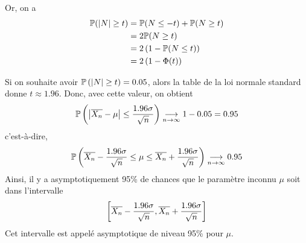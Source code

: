 Or, on a
\begin{equation*}
    \begin{aligned}
        \mathbb{P}(\mathopen{}\left|N\right|\mathclose{}\geq t) 
        &= \mathbb{P}(N\leq -t) + \mathbb{P}(N\geq t)\\
        &= 2\mathbb{P}(N\geq t)\\
        &= 2\left(1-\mathbb{P}(N\leq t)\right)\\
        &= 2\left(1-\Phi(t)\right)
    \end{aligned}
\end{equation*}

Si on souhaite avoir \(\mathbb{P}\left(\mathopen{}\left|N\right|\mathclose{}\geq t\right) = 0.05\), 
alors la table de la loi normale standard donne \(t\approx 1.96\).
Donc, avec cette valeur, on obtient
\begin{equation*}
    \mathbb{P}\left(\mathopen{}\left|\overline{X_n}-\mu\right|\mathclose{}\leq\frac{1.96 \sigma}{\sqrt{n}}\right) \underset{n\to\infty}{\longrightarrow} 1 - 0.05 = 0.95
\end{equation*}
c'est-à-dire,
\begin{equation*}
    \mathbb{P}\left(\overline{X_n}-\frac{1.96\sigma}{\sqrt{n}}\leq \mu \leq \overline{X_n}+\frac{1.96\sigma}{\sqrt{n}}\right) \underset{n\to\infty}{\longrightarrow} 0.95
\end{equation*}
Ainsi, il y a asymptotiquement 95\% de chances que le paramètre
inconnu \(\mu\) soit dans l'intervalle
\begin{equation*}
    \mathopen{}\left[\overline{X_n}-\frac{1.96\sigma}{\sqrt{n}},\overline{X_n}+\frac{1.96\sigma}{\sqrt{n}}\right]\mathclose{}
\end{equation*}
Cet intervalle est appelé 
asymptotique de niveau 95\% pour \(\mu\).

